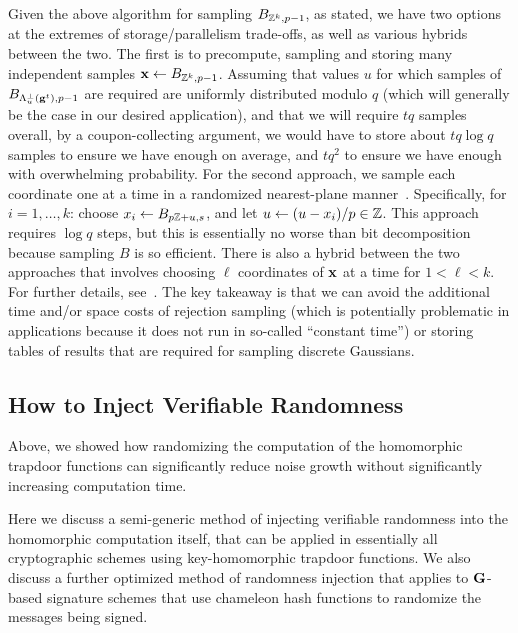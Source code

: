 Given the above algorithm for sampling $B_{\mathbb{Z}^k,p-1}$, as stated, we
have two options at the extremes of storage/parallelism trade-offs, as
well as various hybrids between the two.  The first is to precompute,
sampling and storing many independent samples
$\mathbf{x} \gets B_{\mathbb{Z}^k,p-1}$. Assuming that values $u$ for which samples
of $B_{\Lambda^{\perp}_{u}(\mathbf{g}^t),p-1}$ are required are uniformly
distributed modulo $q$ (which will generally be the case in our
desired application), and that we will require $tq$ samples overall,
by a coupon-collecting argument, we would have to store about
$tq\log{q}$ samples to ensure we have enough on average, and $tq^2$ to
ensure we have enough with overwhelming probability. 
For the second approach, we sample each coordinate one at a time in a
randomized nearest-plane
manner~\cite{DBLP:conf/stoc/GentryPV08,DBLP:conf/eurocrypt/MicciancioP12}. Specifically, 
for $i=1, \ldots, k$: choose $x_i \gets B_{p\mathbb{Z}+u,s}$, and let $u
  \gets (u-x_i)/p \in \mathbb{Z}$. This approach requires $\log{q}$ steps, but
  this is essentially no worse than bit decomposition because sampling
  $B$ is so efficient. There is also a hybrid between the two
  approaches that involves choosing  $\ell$ coordinates of $\mathbf{x}$ at
  a time for $1 < \ell < k$. For further details,
  see~\cite{DBLP:conf/eurocrypt/MicciancioP12}. The key takeaway is
  that we can avoid the additional time and/or space costs of
  rejection sampling (which is potentially problematic in applications
  because it does not run in so-called ``constant time'')
  or storing tables of results that are required for sampling discrete Gaussians.



\subsection{How to Inject Verifiable Randomness}
\label{sec:how-inject-rand}
Above, we showed how randomizing the computation of
the homomorphic trapdoor functions can significantly reduce noise
growth without significantly increasing computation time. 

Here we discuss a semi-generic method of injecting verifiable randomness into the
homomorphic computation itself, that can be applied in essentially all
cryptographic schemes using key-homomorphic trapdoor functions. We also discuss a further optimized method of randomness
injection that applies to $\mathbf{G}$-based signature schemes that use
chameleon hash functions to randomize the messages being signed. 

